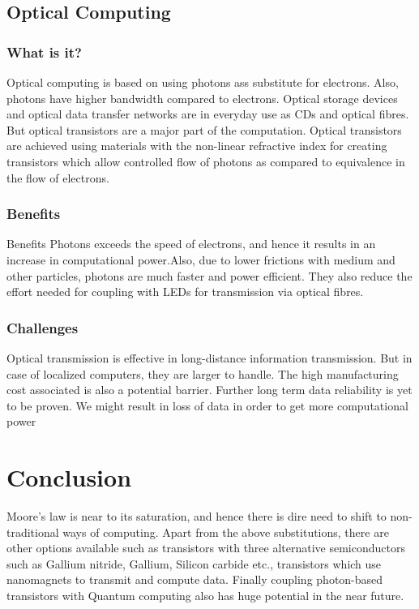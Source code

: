 \documentclass{article}
\begin{document}
    \subsection{Optical Computing}
        \subsubsection{What is it?}
        Optical computing is based on using photons ass substitute for electrons. Also, photons have higher bandwidth compared to electrons. Optical storage devices and optical data transfer networks are in everyday use as CDs and optical fibres. But optical transistors are a major part of the computation. Optical transistors are achieved using materials with the non-linear refractive index for creating transistors which allow controlled flow of photons as compared to equivalence in the flow of electrons.
        \subsubsection{Benefits}
        Benefits Photons exceeds the speed of electrons, and hence it results in an increase in computational power.Also, due to lower frictions with medium and other particles, photons are much faster and power efficient. They also reduce the effort needed for coupling with LEDs for transmission via optical fibres.
        \subsubsection{Challenges}
        Optical transmission is effective in long-distance information transmission. But in case of localized computers, they are larger to handle. The high manufacturing cost associated is also a potential barrier. Further long term data reliability is yet to be proven. We might result in loss of data in order to get more computational power
        \pagebreak
\section{Conclusion}
Moore’s law is near to its saturation, and hence there is dire need to shift to non-traditional ways of computing. Apart from the above substitutions, there are other options available such as transistors with three alternative semiconductors such as Gallium nitride, Gallium, Silicon carbide etc., transistors which use nanomagnets to transmit and compute data. Finally coupling photon-based transistors with Quantum computing also has huge potential in the near future. 
\end{document}
